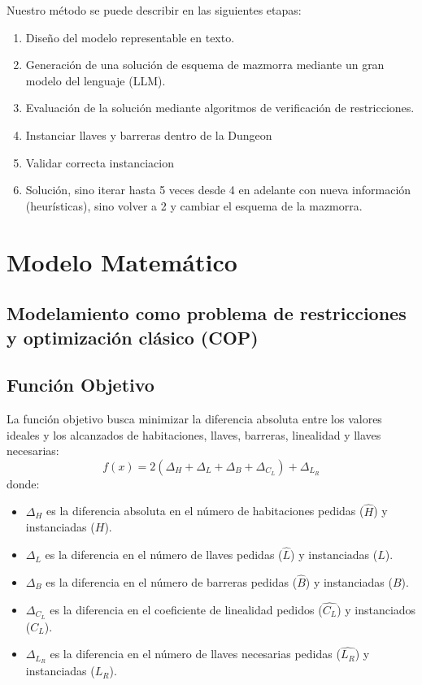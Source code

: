 \documentclass[letter, 10pt]{article}
\begin{document}
Nuestro m\'etodo se puede describir en las siguientes etapas:
\begin{enumerate}
    \item Dise\~no del modelo representable en texto.
    \item Generaci\'on de una soluci\'on de esquema de mazmorra mediante un gran modelo del lenguaje (LLM).
    \item Evaluaci\'on de la soluci\'on mediante algoritmos de verificaci\'on de restricciones.
    \item Instanciar llaves y barreras dentro de la Dungeon
    \item Validar correcta instanciacion
    \item Soluci\'on, sino iterar hasta 5 veces desde 4 en adelante con nueva informaci\'on (heur\'isticas), sino volver a 2 y cambiar el esquema de la mazmorra.
\end{enumerate}
\section{Modelo Matem\'atico}
\subsection*{Modelamiento como problema de restricciones y optimizaci\'on cl\'asico (COP)}

\subsection*{Funci\'on Objetivo}
La funci\'on objetivo busca minimizar la diferencia absoluta entre los valores ideales y los alcanzados de habitaciones, llaves, barreras, linealidad y llaves necesarias:
\[
f(x) = 2 (\Delta_{H}+\Delta_{L}+\Delta_{B}+\Delta_{C_L}) + \Delta_{L_R}
\]
donde:
\begin{itemize}
    \item $\Delta_H$ es la diferencia absoluta en el n\'umero de habitaciones pedidas ($\widehat{H}$) y instanciadas ($H$).
    \item $\Delta_L$ es la diferencia en el n\'umero de llaves pedidas ($\widehat{L}$) y instanciadas ($L$).
    \item $\Delta_B$ es la diferencia en el n\'umero de barreras pedidas ($\widehat{B}$) y instanciadas ($B$).
    \item $\Delta_{C_L}$ es la diferencia en el coeficiente de linealidad pedidos ($\widehat{C_L}$) y instanciados ($C_L$).
    \item $\Delta_{L_R}$ es la diferencia en el n\'umero de llaves necesarias pedidas ($\widehat{L_R}$) y instanciadas ($L_R$).
\end{itemize}
\end{document}
